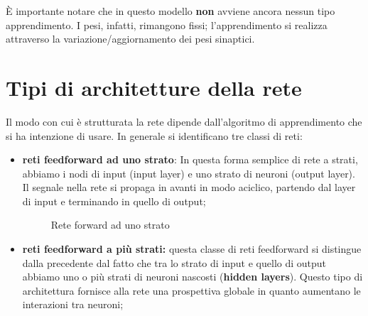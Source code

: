 È importante notare che in questo modello \textbf{non} avviene ancora nessun tipo apprendimento. I pesi, infatti, rimangono fissi; l'apprendimento si realizza attraverso la variazione/aggiornamento dei pesi sinaptici.

\newpage

\section{Tipi di architetture della rete} %
\label{sec:tipi_di_architetture_della_rete}
Il modo con cui è strutturata la rete dipende dall'algoritmo di apprendimento che si ha intenzione di usare. In generale si identificano tre classi di reti:
\begin{itemize}
    \item \textbf{reti feedforward ad uno strato}: In questa forma semplice di rete a strati, abbiamo i nodi di input (input layer) e uno strato di neuroni (output layer). Il segnale nella rete si propaga in avanti in modo aciclico, partendo dal layer di input e terminando in quello di output;
    \begin{figure}[h!]
        \centering
        \caption{Rete forward ad uno strato}
    \end{figure}
    
    \item \textbf{reti feedforward a più strati:} questa classe di reti feedforward si distingue dalla precedente dal fatto che tra lo strato di input e quello di output abbiamo uno o più strati di neuroni nascosti (\textbf{hidden layers}).
Questo tipo di architettura fornisce alla rete una prospettiva globale in quanto aumentano le interazioni tra neuroni;
    \begin{figure}[h!]
        \centering
        \begin{tikzpicture}[->, node distance=\layersep]


\end{tikzpicture}
\end{figure}
\end{itemize}
